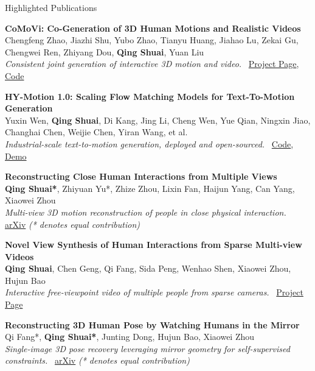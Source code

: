\begin{rSection}{Highlighted Publications}

    {\bf CoMoVi: Co-Generation of 3D Human Motions and Realistic Videos}\hfill{ } \\
    Chengfeng Zhao, Jiazhi Shu, Yubo Zhao, Tianyu Huang, Jiahao Lu, Zekai Gu, Chengwei Ren, Zhiyang Dou, \textbf{Qing Shuai}, Yuan Liu\\
    \emph{Consistent joint generation of interactive 3D motion and video.} \, \href{https://igl-hkust.github.io/CoMoVi/}{Project Page}, \href{https://github.com/IGL-HKUST/CoMoVi}{Code}

    {\bf HY-Motion 1.0: Scaling Flow Matching Models for Text-To-Motion Generation}\hfill{ } \\
    Yuxin Wen, \textbf{Qing Shuai}, Di Kang, Jing Li, Cheng Wen, Yue Qian, Ningxin Jiao, Changhai Chen, Weijie Chen, Yiran Wang, et al.\\
    \emph{Industrial-scale text-to-motion generation, deployed and open-sourced.} \, \href{https://github.com/Tencent-Hunyuan/HY-Motion-1.0}{Code}, \href{https://huggingface.co/spaces/tencent/HY-Motion-1.0}{Demo}

    {\bf Reconstructing Close Human Interactions from Multiple Views}\hfill{ } \\
    \textbf{Qing Shuai*}, Zhiyuan Yu*, Zhize Zhou, Lixin Fan, Haijun Yang, Can Yang, Xiaowei Zhou\\
    \emph{Multi-view 3D motion reconstruction of people in close physical interaction.} \, \href{https://arxiv.org/abs/2401.16173}{arXiv} {\em (* denotes equal contribution)}

    {\bf Novel View Synthesis of Human Interactions from Sparse Multi-view Videos}\hfill{ } \\
    \textbf{Qing Shuai}, Chen Geng, Qi Fang, Sida Peng, Wenhao Shen, Xiaowei Zhou, Hujun Bao\\
    \emph{Interactive free-viewpoint video of multiple people from sparse cameras.} \, \href{https://chingswy.github.io/easymocap-public-doc/works/multinb.html}{Project Page}

    {\bf Reconstructing 3D Human Pose by Watching Humans in the Mirror}\hfill{ } \\
    Qi Fang*, \textbf{Qing Shuai*}, Junting Dong, Hujun Bao, Xiaowei Zhou\\
    \emph{Single-image 3D pose recovery leveraging mirror geometry for self-supervised constraints.} \, \href{https://arxiv.org/abs/2104.00340}{arXiv} {\em (* denotes equal contribution)}


\end{rSection}
